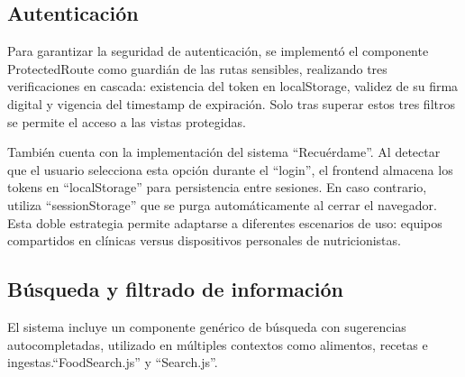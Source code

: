 \subsection*{Autenticación}
Para garantizar la seguridad de autenticación, se implementó el componente ProtectedRoute como guardián de las rutas sensibles, realizando tres verificaciones en cascada: existencia del token en localStorage, validez de su firma digital y vigencia del timestamp de expiración. Solo tras superar estos tres filtros se permite el acceso a las vistas protegidas.

También cuenta con la implementación del sistema ``Recuérdame''. Al detectar que el usuario selecciona esta opción durante el ``login'', el frontend almacena los tokens en ``localStorage'' para persistencia entre sesiones. En caso contrario, utiliza ``sessionStorage'' que se purga automáticamente al cerrar el navegador. Esta doble estrategia permite adaptarse a diferentes escenarios de uso: equipos compartidos en clínicas versus dispositivos personales de nutricionistas.

\subsection*{Búsqueda y filtrado de información}
El sistema incluye un componente genérico de búsqueda con sugerencias autocompletadas, utilizado en múltiples contextos como alimentos, recetas e ingestas.``FoodSearch.js'' y ``Search.js''.

